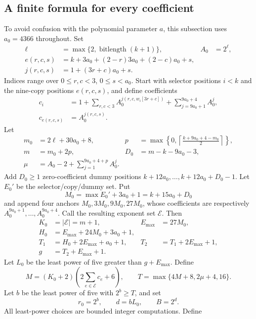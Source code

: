 \documentclass[11pt]{article}
\newcommand{\bitlen}{\operatorname{bitlength}}
\begin{document}
\subsection{A finite formula for every coefficient}
To avoid confusion with the polynomial parameter \(a\), this subsection uses \(a_0=4366\) throughout. Set
\begin{align*}
 \ell&=\max\{2,\bitlen(k+1)\},& A_0&=2^\ell,\\
 e(r,c,s)&=k+3a_0+(2-r)3a_0+(2-c)a_0+s,\\
 j(r,c,s)&=1+(3r+c)a_0+s.
\end{align*}
Indices range over \(0\le r,c<3\), \(0\le s<a_0\). Start with selector positions \(i<k\) and the nine-copy positions \(e(r,c,s)\), and define coefficients
\begin{align*}
 c_i&=1+\sum_{r,c<3}A_0^{j(r,c,w_i[3r+c])}
              +\sum_{j=9a_0+1}^{9a_0+4}A_0^j,\\
 c_{e(r,c,s)}&=A_0^{j(r,c,s)}.
\end{align*}
Let
\begin{align*}
 m_0&=2\ell+30a_0+8,&
 p&=\max\left\{0,\left\lceil\frac{k+9a_0+4-m_0}{2}\right\rceil\right\},\\
 m&=m_0+2p,& D_0&=m-k-9a_0-3,\\
 \mu&=A_0-2+\sum_{j=1}^{9a_0+4+p}A_0^j.
\end{align*}
Add \(D_0\ge1\) zero-coefficient dummy positions \(k+12a_0,\ldots,k+12a_0+D_0-1\). Let \(E_0'\) be the selector/copy/dummy set. Put
\[
 M_0=\max E_0'+3a_0+1=k+15a_0+D_0
\]
and append four anchors \(M_0,3M_0,9M_0,27M_0\), whose coefficients are respectively \(A_0^{9a_0+1},\ldots,A_0^{9a_0+4}\). Call the resulting exponent set \(\mathcal E\). Then
\begin{align*}
 K_0&=|\mathcal E|=m+1,& E_{\max}&=27M_0,\\
 H_0&=E_{\max}+24M_0+3a_0+1,\\
 T_1&=H_0+2E_{\max}+a_0+1,&T_2&=T_1+2E_{\max}+1,\\
 g&=T_2+E_{\max}+1.
\end{align*}
Let \(L_0\) be the least power of five greater than \(g+E_{\max}\). Define
\[
 M=(K_0+2)\left(2\sum_{e\in\mathcal E}c_e+6\right),\qquad
 T=\max\{4M+8,2\mu+4,16\}.
\]
Let \(b\) be the least power of five with \(2^b\ge T\), and set
\[
 r_0=2^b,\qquad d=bL_0,\qquad B=2^d.
\]
All least-power choices are bounded integer computations. Define
\end{document}
